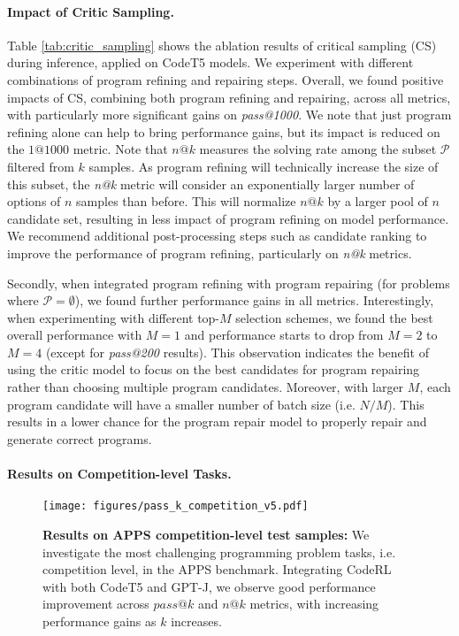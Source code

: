\documentclass{article}
\begin{document}
\paragraph{Impact of Critic Sampling.}
Table \ref{tab:critic_sampling} shows the ablation results of critical sampling (CS) during inference, applied on CodeT5 models. 
We experiment with different combinations of program refining and repairing steps.
Overall, we found positive impacts of CS, combining both program refining and repairing, across all metrics, with particularly more significant gains on \emph{pass@1000}. 
We note that just program refining alone can help to bring performance gains, but its impact is reduced on the $1@1000$ metric. 
Note that $n@k$ measures the solving rate among the subset $\mathcal{P}$ filtered from $k$ samples. 
As program refining will technically increase the size of this subset, the \emph{n@k} metric will consider an exponentially larger number of options of $n$ samples than before. 
This will normalize $n@k$ by a larger pool of $n$ candidate set, resulting in less impact of program refining on model performance.
We recommend additional post-processing steps such as candidate ranking \citep{cobbe2021training} to improve the performance of program refining, particularly on \emph{n@k} metrics. 

Secondly, when integrated program refining with program repairing (for problems where $\mathcal{P}=\emptyset$), we found further performance gains in all metrics. 
Interestingly, when experimenting with different top-$M$ selection schemes, we found the best overall performance with $M=1$ and performance starts to drop from $M=2$ to $M=4$ (except for \emph{pass@200} results). 
This observation indicates the benefit of using the critic model to focus on the best candidates for program repairing rather than choosing multiple program candidates.  
Moreover, with larger $M$, each program candidate will have a smaller number of batch size (i.e. $N/M$).
This results in a lower chance for the program repair model to properly repair and generate correct programs. 

\paragraph{Results on Competition-level Tasks.}



\begin{figure}[t]
	\centering
	\texttt{[image: figures/pass\_k\_competition\_v5.pdf]}
\caption{
  \textbf{Results on APPS competition-level test samples:}
  We investigate the most challenging programming problem tasks, i.e. competition level, in the APPS benchmark. 
  Integrating CodeRL with both CodeT5 and GPT-J, we observe good performance improvement across $pass@k$ and $n@k$ metrics, with increasing performance gains as $k$ increases. 
  }
  \label{fig:pass_k_competition}
\end{figure}
\end{document}
